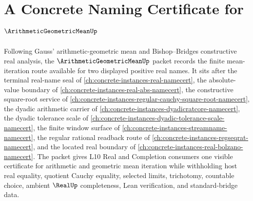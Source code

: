 \chapter{A Concrete Naming Certificate for $\ArithmeticGeometricMeanUp$}
\label{ch:concrete-instances-arithmetic-geometric-mean-namecert}

Following Gauss' arithmetic-geometric mean and Bishop--Bridges constructive real analysis, the $\ArithmeticGeometricMeanUp$ packet records the finite mean-iteration route available for two displayed positive real names. It sits after the terminal real-name seal of \autoref{ch:concrete-instances-real-namecert}, the absolute-value boundary of \autoref{ch:concrete-instances-real-abs-namecert}, the constructive square-root service of \autoref{ch:concrete-instances-regular-cauchy-square-root-namecert}, the dyadic arithmetic carrier of \autoref{ch:concrete-instances-dyadicratcore-namecert}, the dyadic tolerance scale of \autoref{ch:concrete-instances-dyadic-tolerance-scale-namecert}, the finite window surface of \autoref{ch:concrete-instances-streamname-namecert}, the regular rational readback route of \autoref{ch:concrete-instances-regseqrat-namecert}, and the located real boundary of \autoref{ch:concrete-instances-real-bolzano-namecert}. The packet gives L10 Real and Completion consumers one visible certificate for arithmetic and geometric mean iteration while withholding host real equality, quotient Cauchy equality, selected limits, trichotomy, countable choice, ambient $\RealUp$ completeness, Lean verification, and standard-bridge data.


